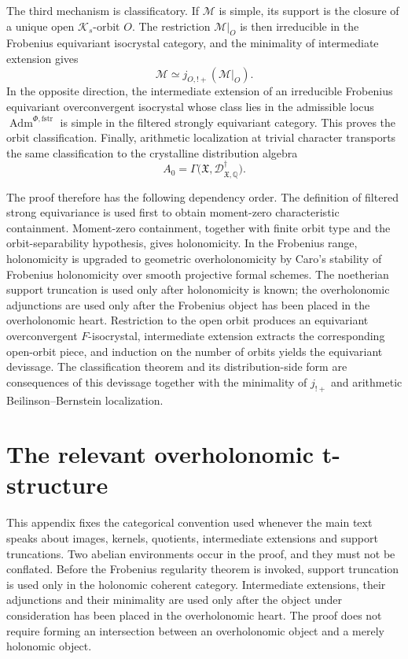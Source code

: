 \documentclass[11pt]{amsart}
\theoremstyle{plain}
\theoremstyle{definition}
\theoremstyle{remark}
\newcommand{\fstr}{\mathrm{fstr}}
\newcommand{\Adm}{\operatorname{Adm}}
\begin{document}
The third mechanism is classificatory.  If \(\mathcal M\) is simple, its
support is the closure of a unique open \(\mathcal K_s\)-orbit \(O\).  The
restriction \(\mathcal M|_O\) is then irreducible in the Frobenius equivariant
isocrystal category, and the minimality of intermediate extension gives
\[
  \mathcal M
  \simeq
  j_{O,!+}(\mathcal M|_O).
\]
In the opposite direction, the intermediate extension of an irreducible
Frobenius equivariant overconvergent isocrystal whose class lies in the admissible
locus \(\Adm^{\Phi,\fstr}\) is simple in the filtered strongly equivariant
category.
This proves the orbit classification.  Finally, arithmetic localization at
trivial character transports the same classification to the crystalline
distribution algebra
\[
  A_0=
  \Gamma\bigl(\mathfrak X,
  \mathscr D^\dagger_{\mathfrak X,\mathbb Q}\bigr).
\]

The proof therefore has the following dependency order.  The definition of
filtered strong equivariance is used first to obtain moment-zero characteristic
containment.  Moment-zero containment, together with finite orbit type and the
orbit-separability hypothesis, gives holonomicity.  In the Frobenius range,
holonomicity is upgraded to geometric overholonomicity by Caro's stability of Frobenius holonomicity over smooth projective formal schemes.  The noetherian support truncation is used only after
holonomicity is known; the overholonomic adjunctions are used only after the
Frobenius object has been placed in the overholonomic heart.  Restriction to the
open orbit produces an equivariant overconvergent \(F\)-isocrystal, intermediate
extension extracts the corresponding open-orbit piece, and induction on the
number of orbits yields the equivariant devissage.  The classification theorem and its distribution-side form are
consequences of this devissage together with the minimality of \(j_{!+}\) and
arithmetic Beilinson--Bernstein localization.


\section{The relevant overholonomic t-structure}
\label{app:t-structure}

This appendix fixes the categorical convention used whenever the main text
speaks about images, kernels, quotients, intermediate extensions and support
truncations.  Two abelian environments occur in the proof, and they must not be
conflated.  Before the Frobenius regularity theorem is invoked, support
truncation is used only in the holonomic coherent category.  Intermediate
extensions, their adjunctions and their minimality are used only after the
object under consideration has been placed in the overholonomic heart.  The
proof does not require forming an intersection between an overholonomic object
and a merely holonomic object.
\end{document}
